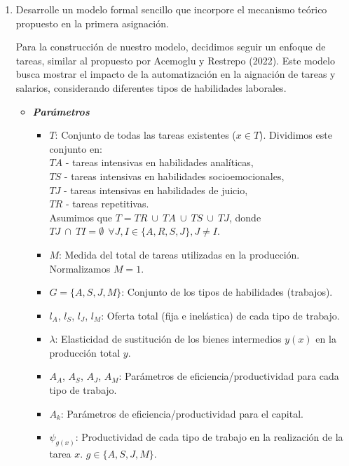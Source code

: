 \documentclass{article}
\theoremstyle{remark}
\theoremstyle{definition}
\begin{document}
\begin{enumerate}
    \item Desarrolle un modelo formal sencillo que incorpore el mecanismo teórico propuesto en la primera asignación.
        \begin{tcolorbox}[title= Soluci\'on 3]
            Para la construcci\'on de nuestro modelo, decidimos seguir un enfoque de tareas, similar al propuesto por Acemoglu y Restrepo (2022). Este modelo busca mostrar el impacto de la automatizaci\'on en la aignaci\'on de tareas y salarios, considerando diferentes tipos de habilidades laborales.
            \begin{itemize}
                \item \textbf{\textit{Par\'ametros}}
                    \begin{itemize}
                        \item $T$: Conjunto de todas las tareas existentes ($x\in T$). Dividimos este conjunto en: \\
                        $TA$ - tareas intensivas en habilidades anal\'iticas, \\ 
                        $TS$ - tareas intensivas en habilidades socioemocionales, \\
                        $TJ$ - tareas intensivas en habilidades de juicio, \\
                        $TR$ - tareas repetitivas. \\
                        Asumimos que $T=TR \ \cup \ TA \ \cup \ TS \ \cup \ TJ$, donde $TJ \ \cap \  TI = \emptyset \ \ \forall J,I\in \{A,R,S,J\}, J \neq I$.
                        \item $M$: Medida del total de tareas utilizadas en la producci\'on. Normalizamos $M=1$. 
                        \item $G=\{A,S,J,M\}$: Conjunto de los tipos de habilidades (trabajos).
                        \item $l_A$, $l_S$, $l_J$, $l_M$: Oferta total (fija e inel\'astica) de cada tipo de trabajo.
                        \item $\lambda$: Elasticidad de sustituci\'on de los bienes intermedios $y(x)$ en la producci\'on total $y$.
                        \item $A_A$, $A_S$, $A_J$, $A_M$: Par\'ametros de eficiencia/productividad para cada tipo de trabajo.
                        \item $A_k$: Par\'ametros de eficiencia/productividad para el capital.
                        \item $\psi_{g(x)}$: Productividad de cada tipo de trabajo en la realizaci\'on de la tarea $x$. $g \in \{A,S,J,M\}$. 


\end{itemize}
\end{itemize}
\end{tcolorbox}
\end{enumerate}
\end{document}

